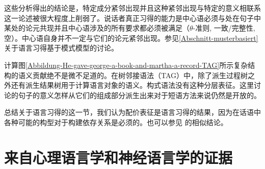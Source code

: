 \begin{exe}
\begin{xlist}[iv.]
\begin{exe}
\begin{xlist}[iv.]
这些分析得出的结论是，特定成分紧邻出现并且这种紧邻出现与特定的意义相联系这一论述被很大程度上削弱了。说话者真正习得的能力是中心语必须与处在句子中某处的论元共现并且中心语涉及的所有要求都必须被满足（$\theta$-准则, 一致/完整性,空\subcatlc）。中心语自身并不一定与它们的论元紧邻出现。参见\ref{Abschnitt-musterbasiert}关于语言习得基于模式模型的讨论。

计算图\ref{Abbildung-He-gave-george-a-book-and-martha-a-record-TAG}所示复杂结构的语义贡献绝不是微不足道的。在树邻接语法\indextag（TAG）中，除了派生过程树之外还有派生结果树用于计算语言对象的语义。构式语法没有这种分层表征。这里讨论的句子的意义怎样从它们的组成部分派生出来对于短语方法来说仍然是开放的。

总结关于语言习得的这一节，我们认为配价表征是语言习得的结果，因为在话语中各种可能的构型对于构建依存关系是必须的。也可以参见 的相似结论。

\section{来自心理语言学和神经语言学的证据}


\end{xlist}
\end{exe}
\end{xlist}
\end{exe}
